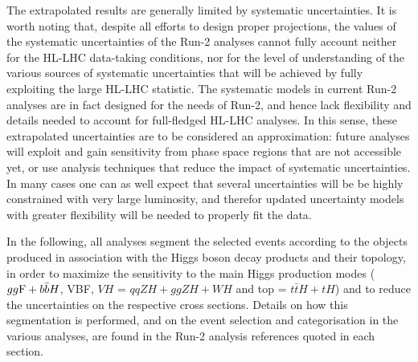 The extrapolated results are generally limited by systematic uncertainties. It is worth noting that, despite all efforts to design proper projections, the values of the systematic uncertainties of the Run-2 analyses cannot fully account neither for the HL-LHC data-taking conditions, nor for the level of understanding of the various sources of systematic uncertainties that will be achieved by fully exploiting the large HL-LHC statistic. The systematic models in current Run-2 analyses are in fact designed for the needs of Run-2, and hence lack flexibility and details needed to account for full-fledged HL-LHC analyses. In this sense, these extrapolated uncertainties are to be considered an approximation: future analyses will exploit and gain sensitivity from phase space regions that are not accessible yet, or use analysis techniques that reduce the impact of systematic uncertainties. In many cases one can as well expect that several uncertainties will be be highly constrained with very large luminosity, and therefor updated uncertainty models with greater flexibility will be needed to properly fit the data.

In the following, all analyses segment the selected events according to the objects produced in association with the Higgs boson decay products and their topology, in order to maximize the sensitivity to the main Higgs production modes ($gg{\rm F}+b\bar{b}H$, VBF, $VH$ = $qqZH+ggZH+WH$ and top = $t\bar{t}H+tH$)  and to reduce the uncertainties on the respective cross sections. Details on how this segmentation is performed, and on the event selection and categorisation in the various analyses, are found in the Run-2 analysis references quoted in each section.
